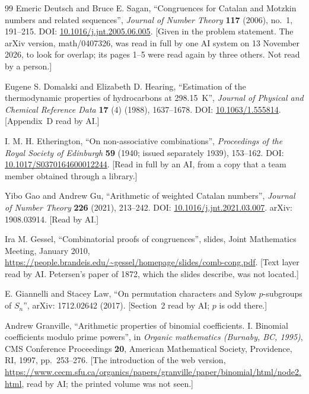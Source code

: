 \documentclass[11pt]{article}
\theoremstyle{definition}
\theoremstyle{remark}
\numberwithin{equation}{section}
\numberwithin{figure}{section}
\begin{document}
\begin{thebibliography}{99}
Emeric Deutsch and Bruce E. Sagan, ``Congruences for Catalan and Motzkin numbers and related sequences'',
\emph{Journal of Number Theory} \textbf{117} (2006), no.~1, 191--215. DOI:
\href{https://doi.org/10.1016/j.jnt.2005.06.005}{10.1016/j.jnt.2005.06.005}. [Given in the problem statement.
The arXiv version, math/0407326, was read in full by one AI system on 13 November 2026, to look for overlap;
its pages 1--5 were read again by three others. Not read by a person.]

Eugene S. Domalski and Elizabeth D. Hearing, ``Estimation of the thermodynamic properties of hydrocarbons at
298.15~K'', \emph{Journal of Physical and Chemical Reference Data} \textbf{17} (4) (1988), 1637--1678. DOI:
\href{https://doi.org/10.1063/1.555814}{10.1063/1.555814}. [Appendix~D read by AI.]

I. M. H. Etherington, ``On non-associative combinations'', \emph{Proceedings of the Royal Society of
Edinburgh} \textbf{59} (1940; issued separately 1939), 153--162. DOI:
\href{https://doi.org/10.1017/S0370164600012244}{10.1017/S0370164600012244}. [Read in full by an AI, from a
copy that a team member obtained through a library.]

Yibo Gao and Andrew Gu, ``Arithmetic of weighted Catalan numbers'', \emph{Journal of Number Theory}
\textbf{226} (2021), 213--242. DOI: \href{https://doi.org/10.1016/j.jnt.2021.03.007}{10.1016/j.jnt.2021.03.007}.
arXiv: 1908.03914. [Read by AI.]

Ira M. Gessel, ``Combinatorial proofs of congruences'', slides, Joint Mathematics Meeting, January 2010,
\url{https://people.brandeis.edu/~gessel/homepage/slides/comb-cong.pdf}. [Text layer read by AI. Petersen's
paper of 1872, which the slides describe, was not located.]

E. Giannelli and Stacey Law, ``On permutation characters and Sylow $p$-subgroups of $S_n$'', arXiv:
1712.02642 (2017). [Section~2 read by AI; $p$ is odd there.]

Andrew Granville, ``Arithmetic properties of binomial coefficients. I. Binomial coefficients modulo prime
powers'', in \emph{Organic mathematics (Burnaby, BC, 1995)}, CMS Conference Proceedings \textbf{20}, American
Mathematical Society, Providence, RI, 1997, pp.~253--276. [The introduction of the web version,
\url{https://www.cecm.sfu.ca/organics/papers/granville/paper/binomial/html/node2.html}, read by AI; the
printed volume was not seen.]


\end{thebibliography}
\end{document}
